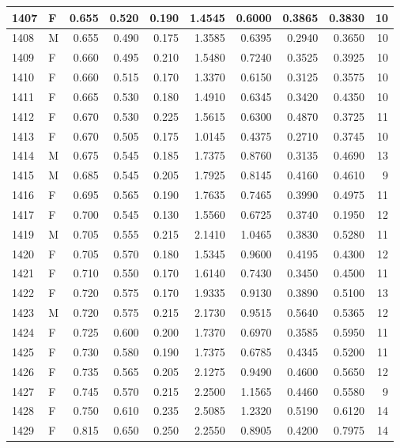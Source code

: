 \documentclass[9pt,twocolumn,twoside,]{pnas-new}
\begin{document}
\begin{tabular}{l|l|r|r|r|r|r|r|r|r}
\hline
1407 & F & 0.655 & 0.520 & 0.190 & 1.4545 & 0.6000 & 0.3865 & 0.3830 & 10\\
\hline
1408 & M & 0.655 & 0.490 & 0.175 & 1.3585 & 0.6395 & 0.2940 & 0.3650 & 10\\
\hline
1409 & F & 0.660 & 0.495 & 0.210 & 1.5480 & 0.7240 & 0.3525 & 0.3925 & 10\\
\hline
1410 & F & 0.660 & 0.515 & 0.170 & 1.3370 & 0.6150 & 0.3125 & 0.3575 & 10\\
\hline
1411 & F & 0.665 & 0.530 & 0.180 & 1.4910 & 0.6345 & 0.3420 & 0.4350 & 10\\
\hline
1412 & F & 0.670 & 0.530 & 0.225 & 1.5615 & 0.6300 & 0.4870 & 0.3725 & 11\\
\hline
1413 & F & 0.670 & 0.505 & 0.175 & 1.0145 & 0.4375 & 0.2710 & 0.3745 & 10\\
\hline
1414 & M & 0.675 & 0.545 & 0.185 & 1.7375 & 0.8760 & 0.3135 & 0.4690 & 13\\
\hline
1415 & M & 0.685 & 0.545 & 0.205 & 1.7925 & 0.8145 & 0.4160 & 0.4610 & 9\\
\hline
1416 & F & 0.695 & 0.565 & 0.190 & 1.7635 & 0.7465 & 0.3990 & 0.4975 & 11\\
\hline
1417 & F & 0.700 & 0.545 & 0.130 & 1.5560 & 0.6725 & 0.3740 & 0.1950 & 12\\
\hline
1419 & M & 0.705 & 0.555 & 0.215 & 2.1410 & 1.0465 & 0.3830 & 0.5280 & 11\\
\hline
1420 & F & 0.705 & 0.570 & 0.180 & 1.5345 & 0.9600 & 0.4195 & 0.4300 & 12\\
\hline
1421 & F & 0.710 & 0.550 & 0.170 & 1.6140 & 0.7430 & 0.3450 & 0.4500 & 11\\
\hline
1422 & F & 0.720 & 0.575 & 0.170 & 1.9335 & 0.9130 & 0.3890 & 0.5100 & 13\\
\hline
1423 & M & 0.720 & 0.575 & 0.215 & 2.1730 & 0.9515 & 0.5640 & 0.5365 & 12\\
\hline
1424 & F & 0.725 & 0.600 & 0.200 & 1.7370 & 0.6970 & 0.3585 & 0.5950 & 11\\
\hline
1425 & F & 0.730 & 0.580 & 0.190 & 1.7375 & 0.6785 & 0.4345 & 0.5200 & 11\\
\hline
1426 & F & 0.735 & 0.565 & 0.205 & 2.1275 & 0.9490 & 0.4600 & 0.5650 & 12\\
\hline
1427 & F & 0.745 & 0.570 & 0.215 & 2.2500 & 1.1565 & 0.4460 & 0.5580 & 9\\
\hline
1428 & F & 0.750 & 0.610 & 0.235 & 2.5085 & 1.2320 & 0.5190 & 0.6120 & 14\\
\hline
1429 & F & 0.815 & 0.650 & 0.250 & 2.2550 & 0.8905 & 0.4200 & 0.7975 & 14\\

\end{tabular}
\end{document}

